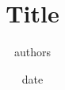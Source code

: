 \documentclass{article}
\title{Title}
\author{authors}
\date{date}
\begin{document}
\maketitle

\begin{abstract}
  
\end{abstract}









\printbibliography

\end{document}
